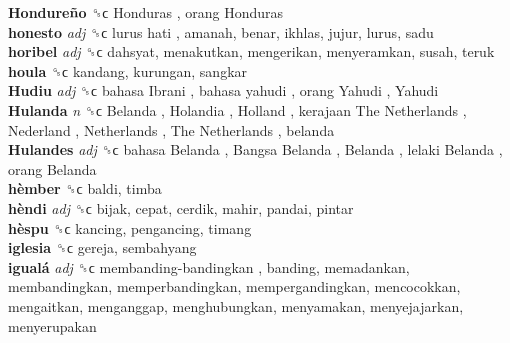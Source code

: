 \textbf{Hondureño} ␝ϲ   Honduras ,  orang Honduras   \\
\textbf{honesto} \emph{adj}  ␝ϲ   lurus hati , amanah, benar, ikhlas, jujur, lurus, sadu  \\
\textbf{horibel} \emph{adj}  ␝ϲ  dahsyat, menakutkan, mengerikan, menyeramkan, susah, teruk  \\
\textbf{houla} ␝ϲ  kandang, kurungan, sangkar  \\
\textbf{Hudiu} \emph{adj}  ␝ϲ   bahasa Ibrani ,  bahasa yahudi ,  orang Yahudi ,  Yahudi   \\
\textbf{Hulanda} \emph{n}  ␝ϲ   Belanda ,  Holandia ,  Holland ,  kerajaan The Netherlands ,  Nederland ,  Netherlands ,  The Netherlands , belanda  \\
\textbf{Hulandes} \emph{adj}  ␝ϲ   bahasa Belanda ,  Bangsa Belanda ,  Belanda ,  lelaki Belanda ,  orang Belanda   \\
\textbf{hèmber} ␝ϲ  baldi, timba  \\
\textbf{hèndi} \emph{adj}  ␝ϲ  bijak, cepat, cerdik, mahir, pandai, pintar  \\
\textbf{hèspu} ␝ϲ  kancing, pengancing, timang  \\
\textbf{iglesia} ␝ϲ  gereja, sembahyang  \\
\textbf{igualá} \emph{adj}  ␝ϲ   membanding-bandingkan , banding, memadankan, membandingkan, memperbandingkan, mempergandingkan, mencocokkan, mengaitkan, menganggap, menghubungkan, menyamakan, menyejajarkan, menyerupakan  \\
